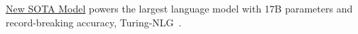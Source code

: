 \underline{New SOTA Model} \name powers the largest language model with 17B parameters and record-breaking accuracy, Turing-NLG~\cite{t-nlg}.

